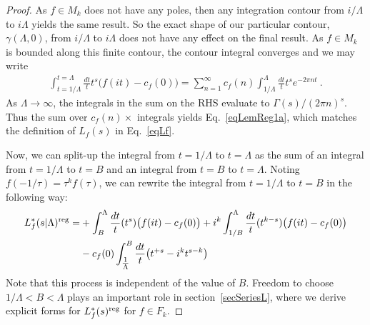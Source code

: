 \documentclass[11pt,a4paper]{article}
\newcommand{\g}{\gamma}
\newcommand{\G}{\Gamma}
\newcommand{\La}{\Lambda}
\newcommand{\reg}{{\rm reg}}
\begin{document}
\begin{proof}
As $f \in M_k$ does not have any poles, then any integration contour from $i/\Lambda$ to $i\Lambda$ yields the same result. So the exact shape of our particular contour, $\g(\La,0)$, from $i/\La$ to $i \La$ does not have any effect on the final result. As $f \in M_k$ is bounded along this finite contour, the contour integral converges and we may write 
\begin{align}
\int_{t = 1/\Lambda}^{t = \Lambda} \frac{dt}{t} t^s \big( f(it) -c_f(0) \big) = 
\sum_{n =1}^{\infty} c_f(n) \int_{1/\Lambda}^{\Lambda} \frac{dt}{t} t^s e^{-2 \pi n t} ~.
\end{align}
As $\Lambda \to \infty$, the integrals in the sum on the RHS evaluate to $\G(s)/(2\pi n)^{s}$. Thus the sum over $c_f(n) \times$ integrals yields Eq.~\eqref{eqLemReg1a}, which matches the definition of $L_f(s)$ in Eq.~\eqref{eqLf}. 

Now, we can split-up the integral from $t = 1/\La$ to $t = \La$ as the sum of an integral from $t = 1/\La$ to $t = B$ and an integral from $t = B$ to $t = \La$.  Noting $f(-1/\tau) = \tau^k f(\tau)$, we can rewrite the integral from $t = 1/\La$ to $t = B$  in the following way:
\begin{align}
\begin{split}
L_f^*(s|\Lambda)^\reg =
&+\int_{B}^{\Lambda} \frac{dt}{t} (t^s) \big( f(it) -c_f(0) \big)+i^k \int_{1/B}^{\Lambda} \frac{dt}{t}  (t^{k-s}) \big( f(it) -c_f(0) \big) \\
&-c_f(0) \int_{\tfrac1\Lambda}^{B} \frac{dt}{t} \big( t^{+s} - i^k t^{s-k} \big)
\end{split}
\label{eqT0Lf}
\end{align}
Note that this process is independent of the value of $B$. Freedom to choose $1/\La < B < \La$ plays an important role in section~\ref{secSeriesL}, where we derive explicit forms for $L_f^*(s)^\reg$ for $f \in F_k$. 


\end{proof}
\end{document}
